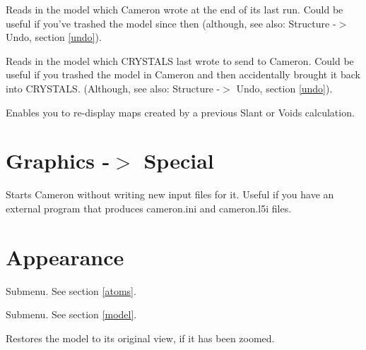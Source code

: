 \documentclass[10pt,a4paper]{report}
\begin{document}
\bigskip{}




Reads in the model which Cameron wrote at the end of its last run.
Could be useful if you've trashed the model since then (although, see also:
Structure -$>$ Undo, section \ref{undo}).



\bigskip{}




Reads in the model which CRYSTALS last wrote to send to Cameron.
Could be useful if you trashed the model in Cameron and then accidentally
brought it back into CRYSTALS. (Although, see also:
Structure -$>$ Undo, section \ref{undo}).



\bigskip{}




Enables you to re-display maps created by a previous Slant or Voids 
calculation.



\section{Graphics -$>$ Special}
\label{special} 


\bigskip{}




Starts Cameron without writing new input files for it. Useful if you
have an external program that produces cameron.ini and cameron.l5i files.

\section{Appearance}




\bigskip{}




Submenu. See section \ref{atoms}.



\bigskip{}




Submenu. See section \ref{model}.



\bigskip{}




Restores the model to its original view, if it has been zoomed.
\end{document}
